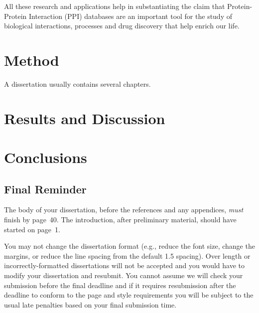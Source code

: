 \documentclass[msc,deptreport,ai]{infthesis}      %
\begin{document}
All these research and applications help in substantiating the claim that Protein-Protein Interaction (PPI) databases are an important tool for the study of biological interactions, processes and drug discovery that help enrich our life.
 

\chapter{Method}

A dissertation usually contains several chapters.

\chapter{Results and Discussion}

\chapter{Conclusions}

\section{Final Reminder}

The body of your dissertation, before the references and any appendices,
\emph{must} finish by page~40. The introduction, after preliminary material,
should have started on page~1.

You may not change the dissertation format (e.g., reduce the font
size, change the margins, or reduce the line spacing from the default
1.5 spacing). Over length or incorrectly-formatted dissertations will
not be accepted and you would have to modify your dissertation and
resubmit.  You cannot assume we will check your submission before the
final deadline and if it requires resubmission after the deadline to
conform to the page and style requirements you will be subject to the
usual late penalties based on your final submission time.




% 
% 
% 
\end{document}
